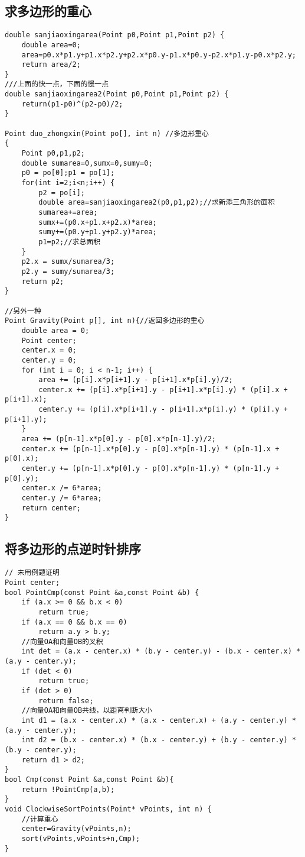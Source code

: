 \subsection{求多边形的重心}
\begin{lstlisting}
double sanjiaoxingarea(Point p0,Point p1,Point p2) {
	double area=0;
	area=p0.x*p1.y+p1.x*p2.y+p2.x*p0.y-p1.x*p0.y-p2.x*p1.y-p0.x*p2.y;
	return area/2;
}
///上面的快一点，下面的慢一点
double sanjiaoxingarea2(Point p0,Point p1,Point p2) {
	return(p1-p0)^(p2-p0)/2;
}

Point duo_zhongxin(Point po[], int n) //多边形重心
{
	Point p0,p1,p2;
	double sumarea=0,sumx=0,sumy=0;
	p0 = po[0];p1 = po[1];
	for(int i=2;i<n;i++) {
		p2 = po[i];
		double area=sanjiaoxingarea2(p0,p1,p2);//求新添三角形的面积
		sumarea+=area;
		sumx+=(p0.x+p1.x+p2.x)*area;
		sumy+=(p0.y+p1.y+p2.y)*area;
		p1=p2;//求总面积
	}
	p2.x = sumx/sumarea/3;
	p2.y = sumy/sumarea/3;
	return p2;
}

//另外一种
Point Gravity(Point p[], int n){//返回多边形的重心
	double area = 0;
	Point center;
	center.x = 0;
	center.y = 0;
	for (int i = 0; i < n-1; i++) {
		area += (p[i].x*p[i+1].y - p[i+1].x*p[i].y)/2;
		center.x += (p[i].x*p[i+1].y - p[i+1].x*p[i].y) * (p[i].x + p[i+1].x);
		center.y += (p[i].x*p[i+1].y - p[i+1].x*p[i].y) * (p[i].y + p[i+1].y);
	}
	area += (p[n-1].x*p[0].y - p[0].x*p[n-1].y)/2;
	center.x += (p[n-1].x*p[0].y - p[0].x*p[n-1].y) * (p[n-1].x + p[0].x);
	center.y += (p[n-1].x*p[0].y - p[0].x*p[n-1].y) * (p[n-1].y + p[0].y);
	center.x /= 6*area;
	center.y /= 6*area;
	return center;
}
\end{lstlisting}

\subsection{将多边形的点逆时针排序}
\begin{lstlisting}
// 未用例题证明
Point center;
bool PointCmp(const Point &a,const Point &b) {
	if (a.x >= 0 && b.x < 0)
		return true;
	if (a.x == 0 && b.x == 0)
		return a.y > b.y;
	//向量OA和向量OB的叉积
	int det = (a.x - center.x) * (b.y - center.y) - (b.x - center.x) * (a.y - center.y);
	if (det < 0)
		return true;
	if (det > 0)
		return false;
	//向量OA和向量OB共线，以距离判断大小
	int d1 = (a.x - center.x) * (a.x - center.x) + (a.y - center.y) * (a.y - center.y);
	int d2 = (b.x - center.x) * (b.x - center.y) + (b.y - center.y) * (b.y - center.y);
	return d1 > d2;
}
bool Cmp(const Point &a,const Point &b){
	return !PointCmp(a,b);
}
void ClockwiseSortPoints(Point* vPoints, int n) {
	//计算重心
	center=Gravity(vPoints,n);
	sort(vPoints,vPoints+n,Cmp);
}
\end{lstlisting}

